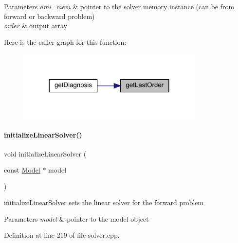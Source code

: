 \begin{DoxyParams}{Parameters}
{\em ami\+\_\+mem} & pointer to the solver memory instance (can be from forward or backward problem) \\
\hline
{\em order} & output array \\
\hline
\end{DoxyParams}
Here is the caller graph for this function\+:
\nopagebreak
\begin{figure}[H]
\begin{center}
\leavevmode
\includegraphics[width=264pt]{classamici_1_1_solver_a491a5e0ffd6c1678a8bb5313df88ab45_icgraph}
\end{center}
\end{figure}
\mbox{\label{classamici_1_1_solver_a6f41389f3a02d0b1ed9bfebcc080d3e1}} 
\paragraph{\texorpdfstring{initializeLinearSolver()}{initializeLinearSolver()}}
{\footnotesize\ttfamily void initialize\+Linear\+Solver (\begin{DoxyParamCaption}\item[{const \mbox{\hyperlink{classamici_1_1_model}{Model}} $\ast$}]{model }\end{DoxyParamCaption})\hspace{0.3cm}{\ttfamily [protected]}}

initialize\+Linear\+Solver sets the linear solver for the forward problem


\begin{DoxyParams}{Parameters}
{\em model} & pointer to the model object \\
\hline
\end{DoxyParams}


Definition at line 219 of file solver.\+cpp.

